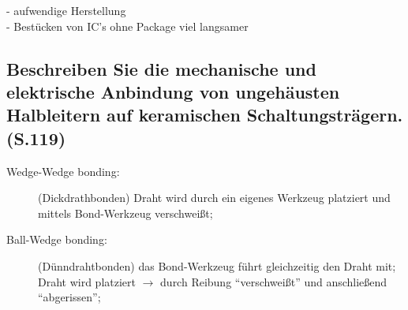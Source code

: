 - aufwendige Herstellung \\
- Bestücken von IC's ohne Package viel langsamer

\subsection{Beschreiben Sie die mechanische und elektrische Anbindung von ungehäusten Halbleitern auf keramischen Schaltungsträgern. (S.119)}
\begin{description}
\item[Wedge-Wedge bonding:] (Dickdrathbonden) Draht wird durch ein eigenes Werkzeug platziert und 
  mittels Bond-Werkzeug verschweißt;
\item[Ball-Wedge bonding:] (Dünndrahtbonden) das Bond-Werkzeug führt gleichzeitig den Draht mit; 
  Draht wird platziert $\rightarrow$ durch Reibung ``verschweißt'' und anschließend ``abgerissen'';
\end{description}
